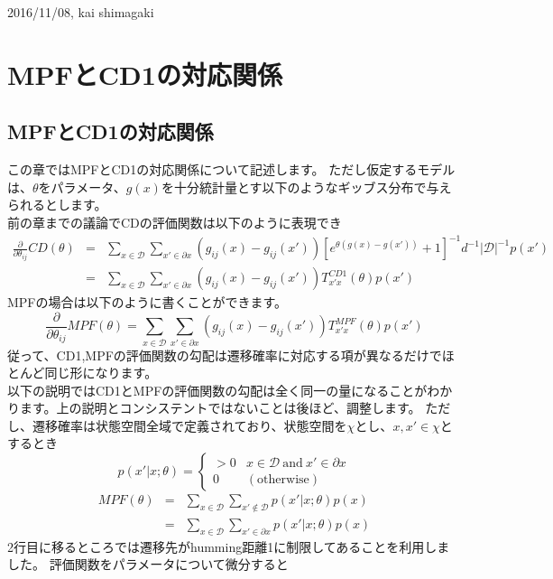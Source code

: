 \documentclass[11pt]{article}
\begin{document}
\begin{flushright}
2016/11/08, kai shimagaki
\end{flushright}
\section{MPFとCD1の対応関係}
\subsection{MPFとCD1の対応関係}
この章ではMPFとCD1の対応関係について記述します。
ただし仮定するモデルは、$\theta$をパラメータ、$g(x)$を十分統計量とす以下のようなギッブス分布で与えられるとします。\\
前の章までの議論でCDの評価関数は以下のように表現でき
\begin{eqnarray}
\frac{\partial }{\partial \theta_{ij}}CD(\theta)&=&\sum_{x\in{\mathcal D}}\sum_{x'\in{\partial x}}(g_{ij}(x)-g_{ij}(x'))[e^{\theta(g(x)-g(x'))}+1]^{-1}d^{-1}|{\mathcal D}|^{-1}p(x')\\
&=&\sum_{x\in{\mathcal D}}\sum_{x'\in{\partial x}}(g_{ij}(x)-g_{ij}(x'))T_{x'x}^{CD1}(\theta)p(x')
\end{eqnarray}
MPFの場合は以下のように書くことができます。
\begin{equation}
\frac{\partial}{\partial \theta_{ij}}MPF(\theta)=\sum_{x\in{\mathcal D}}\sum_{x'\in{\partial x}}(g_{ij}(x)-g_{ij}(x'))T_{x'x}^{MPF}(\theta)p(x')
\end{equation}
従って、CD1,MPFの評価関数の勾配は遷移確率に対応する項が異なるだけでほとんど同じ形になります。\\
以下の説明ではCD1とMPFの評価関数の勾配は全く同一の量になることがわかります。上の説明とコンシステントではないことは後ほど、調整します。
ただし、遷移確率は状態空間全域で定義されており、状態空間を$\chi$とし、$x,x'\in \chi$とするとき
\[
  p(x'|x;\theta) = \begin{cases}
    >0 & x\in{\mathcal D}\ \text{and}\ x'\in \partial x \\
    0 & (\text{otherwise})
  \end{cases}
\]
\begin{eqnarray}
MPF(\theta)&=&\sum_{x\in {\mathcal D}}\sum_{x'\not\in{\mathcal D}}p(x'|x;\theta)p(x)\\
&=&\sum_{x\in {\mathcal D}}\sum_{x'\in \partial x}p(x'|x;\theta)p(x)
\end{eqnarray}
2行目に移るところでは遷移先がhumming距離1に制限してあることを利用しました。
評価関数をパラメータについて微分すると
\end{document}
